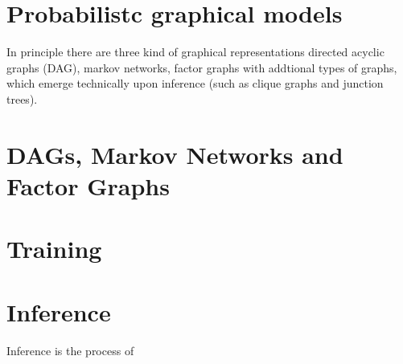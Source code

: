 \section{Probabilistc graphical models}
In principle there are three kind of graphical representations
directed acyclic graphs (DAG), markov networks, factor graphs
with addtional types of graphs, which emerge technically  upon inference  (such as clique graphs and junction trees).

\section{DAGs, Markov Networks and Factor Graphs}

\section{Training}
\section{Inference}
Inference is the process of 